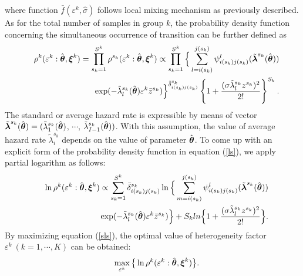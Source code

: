 where function $\bar{f}(\varepsilon^k,\hat{\sigma})$ follows local mixing mechanism as previously described. As for the total number of samples in group $k$, the probability density function concerning the simultaneous occurrence of transition can be further defined as
\begin{eqnarray}
      && \rho^k(\varepsilon^k:\hat{\mbox{\boldmath$\theta$}},\mbox{\boldmath$\xi$}^k) = \prod_{s_{k}=1}^{S^k}\rho^{s_k}(\varepsilon^k:\hat{\mbox{\boldmath$\theta$}},\mbox{\boldmath$\xi$}^k)  
 \propto \prod_{s_{k}=1}^{S^k} \Big\{ \sum_{l=i(s_{k})}^{j(s_{k})}\psi_{i(s_{k})j(s_{k})}^l(\tilde{\mbox{\boldmath$\lambda$}}^{s_{k}}(\hat{\mbox{\boldmath$\theta$}}))\nonumber\\
&& \hspace{5mm} \exp (-\tilde{\lambda}_{l}^{s_{k}}(\hat{\mbox{\boldmath$\theta$}})\varepsilon^k \bar{z}^{s_{k}}) \Big\}^{\bar{\delta}_{i(s_{k})j(s_{k})}^{s_{k}}} 
\left\{1 + \frac{(\sigma\tilde{\lambda}_l^{s_k}z^{s_k})^2}{2!}\right\}^{S_k} .\label{ls} 
\end {eqnarray}
The standard or average hazard rate is expressible by means of vector $\tilde{\mbox{\boldmath$\lambda$}}^{s_{k}}(\hat{\mbox{\boldmath$\theta$}})=(\tilde{\lambda}_1^{s_{k}}(\hat{\mbox{\boldmath$\theta$}})$, $\cdots$, $\tilde{\lambda}_{I-1}^{s_{k}}(\hat{\mbox{\boldmath$\theta$}}))$. With this assumption, the value of average hazard rate $\tilde{\lambda}_i^{s_{k}} $ depends on the value of parameter $\hat{\mbox{\boldmath$\theta$}}$. To come up with an explicit form of the probability density function in equation (\ref{ls}), we apply partial logarithm as follows: 
\begin{eqnarray}
&& \ln \rho^k(\varepsilon^k:\hat{\mbox{\boldmath$\theta$}},\mbox{\boldmath$\xi$}^k) 
 \propto \sum_{s_{k}=1}^{S^k} \bar{\delta}_{i(s_{k})j(s_{k})}^{s_{k}} \ln \Big\{ \sum_{m=i(s_{k})}^{j(s_{k})}\psi_{i(s_{k})j(s_{k})}^l(\tilde{\mbox{\boldmath$\lambda$}}^{s_{k}}(\hat{\mbox{\boldmath$\theta$}}))\nonumber\\
&& \hspace{2mm} \exp (-\tilde{\lambda}_{l}^{s_{k}}(\hat{\mbox{\boldmath$\theta$}})\varepsilon^k \bar{z}^{s_{k}}) \Big\} +S_{k}ln\Big\{1 + \frac{(\sigma\tilde{\lambda}_l^{s_k}z^{s_k})^2}{2!}\Big\} . \label{sls}
\end {eqnarray}
By maximizing equation (\ref{sls}), the optimal value of heterogeneity factor $\varepsilon^k~(k=1,\cdots,K)$ can be obtained:
%
\begin{eqnarray}
&& \max_{\varepsilon^k} \big\{\ln \rho^k(\varepsilon^k:\hat{\mbox{\boldmath$\theta$}},\mbox{\boldmath$\xi$}^k)\big\}. \label{sei2}
\end{eqnarray}
%
